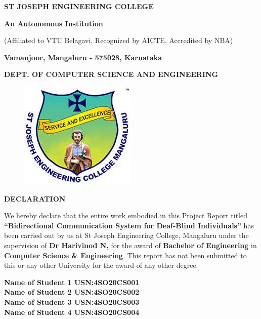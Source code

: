\documentclass[12pt,a4paper]{report}
\begin{document}
\centering
\LARGE \textbf{ST JOSEPH ENGINEERING COLLEGE}
\par
\Large \textbf{An Autonomous Institution}
\par \large{(Affiliated to VTU Belagavi, Recognized by AICTE, Accredited by NBA)}
\par \vspace{3pt}
\large \textbf{Vamanjoor, Mangaluru - 575028, Karnataka}
\par \vspace{12pt}  
\par
\large \textbf{DEPT. OF COMPUTER SCIENCE AND ENGINEERING}
\par
\begin{figure}[hbtp]
\centering
\includegraphics[scale=0.5]{./pic/sjeclogo}
\end{figure}

\begin{center}
{\Large \textbf{DECLARATION}}
\end{center}
\justifying
\par
{}
\noindent We hereby declare that the entire work embodied in this Project Report titled
\textbf{``Bidirectional Communication System for Deaf-Blind Individuals''} has been carried out by us at St Joseph Engineering College, Mangaluru under the supervision of \textbf{Dr Harivinod N,} for the award of \textbf{Bachelor of Engineering} in \textbf{Computer Science \& Engineering}. This report has not been submitted to this or any other University  for the award of any  other degree. \\
\vspace{0.25in}

\begin{flushleft}
\textbf{Name of Student 1  USN:4SO20CS001}\\
\vspace{0.1in}
\textbf{Name of Student 2  USN:4SO20CS002}\\
\vspace{0.1in}
\textbf{Name of Student 3  USN:4SO20CS003}\\
\vspace{0.1in}
\textbf{Name of Student 4  USN:4SO20CS004}\\
\end{flushleft}
\end{document}
